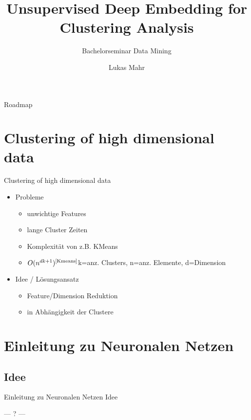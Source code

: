 \documentclass{beamer}
\title{Unsupervised Deep Embedding for Clustering Analysis}
\subtitle{Bachelorseminar Data Mining}
\author{Lukas Mahr}
\institute{Ludwig-Maximilians-Universität München}
\date{}
\begin{document}
\begin{frame}
\titlepage
\end{frame}


\begin{frame}[plain]{Roadmap}
\tableofcontents
\end{frame}

\section{Clustering of high dimensional data}
\begin{frame}[t]{Clustering of high dimensional data}\vspace{4pt}
\begin{itemize}
\item Probleme
\begin{itemize}
\item unwichtige Features
\item lange Cluster Zeiten
\item Komplexität von z.B. KMeans
\item $O(n^{dk+1})^{\text{\cite{Kmeans}}}$k=anz. Clusters, n=anz. Elemente, d=Dimension
\end{itemize}
\item Idee / Lösungsansatz 
\begin{itemize}
\item Feature/Dimension Reduktion
\item in Abhängigkeit der Clustere
\end{itemize}
\end{itemize}
\end{frame}

\section{Einleitung zu Neuronalen Netzen}
\subsection{Idee}
\begin{frame}[t]{Einleitung zu Neuronalen Netzen}\vspace{4pt}
Idee

--- ? ---
\end{frame}
\end{document}
